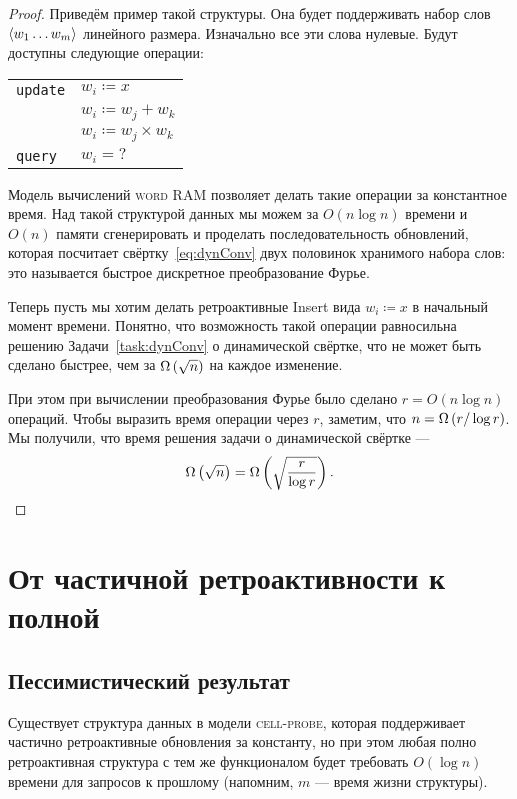 \begin{proof}
	Приведём пример такой структуры. Она будет поддерживать набор слов $\left\langle w_1 \ldots w_m \right\rangle$ линейного размера. Изначально все эти слова нулевые. Будут доступны следующие операции:

\begin{center} \begin{tabular}{ll}
	{\tt update} & $w_i \coloneqq x$ \\
		& $w_i \coloneqq w_j + w_k$ \\
		& $w_i \coloneqq w_j \times w_k$ \\
	{\tt query} & $w_i = \text{?}$
\end{tabular} \end{center}

	Модель вычислений {\scshape word RAM} позволяет делать такие операции за константное время. Над такой структурой данных мы можем за $O(n \log n)$ времени и $O(n)$ памяти сгенерировать и проделать последовательность обновлений, которая посчитает свёртку~\eqref{eq:dynConv} двух половинок хранимого набора слов: это называется быстрое дискретное преобразование Фурье.
	
	Теперь пусть мы хотим делать ретроактивные Insert вида $w_i \coloneqq x$ в начальный момент времени. Понятно, что возможность такой операции равносильна решению Задачи~\ref{task:dynConv} о динамической свёртке, что не может быть сделано быстрее, чем за $\Omega \left( \sqrt{n} \right)$ на каждое изменение.
	
	При этом при вычислении преобразования Фурье было сделано $r = O(n \log n)$ операций. Чтобы выразить время операции через $r$, заметим, что $n = \Omega \left( r / \log r \right)$. Мы получили, что время решения задачи о динамической свёртке —
     \begin{equation*}
	\Omega \left( \sqrt{n} \right) = \Omega \left( \sqrt{\frac{r}{\log r}} \right).
     \end{equation*}
\end{proof}

\section{От частичной ретроактивности к полной} 
\subsection{Пессимистический результат}

\begin{theorem}
	Существует структура данных в модели {\scshape cell-probe}, которая поддерживает частично ретроактивные обновления за константу, но при этом любая полно ретроактивная структура с тем же функционалом будет требовать $O(\log n)$ времени для запросов к прошлому (напомним, $m$ — время жизни структуры).
\end{theorem}

